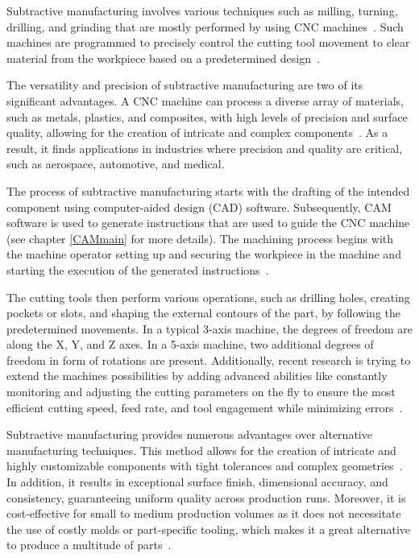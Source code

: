 Subtractive manufacturing involves various techniques such as milling, turning, drilling, and grinding that are mostly performed by using CNC machines~\cite{Kumar.2020}. Such machines are programmed to precisely control the cutting tool movement to clear material from the workpiece based on a predetermined design~\cite{Amanullah.2017}.

The versatility and precision of subtractive manufacturing are two of its significant advantages. A CNC machine can process a diverse array of materials, such as metals, plastics, and composites, with high levels of precision and surface quality, allowing for the creation of intricate and complex components~\cite{Tomaz.2021,Yang.2019}. As a result, it finds applications in industries where precision and quality are critical, such as aerospace, automotive, and medical.

The process of subtractive manufacturing starts with the drafting of the intended component using computer-aided design (CAD) software. Subsequently, CAM software is used to generate instructions that are used to guide the CNC machine (see chapter \ref{CAMmain} for more details). The machining process begins with the machine operator setting up and securing the workpiece in the machine and starting the execution of the generated instructions~\cite{Nee.2015}.

The cutting tools then perform various operations, such as drilling holes, creating pockets or slots, and shaping the external contours of the part, by following the predetermined movements. In a typical 3-axis machine, the degrees of freedom are along the X, Y, and Z axes. In a 5-axis machine, two additional degrees of freedom in form of rotations are present.   Additionally, recent research is trying to extend the machines possibilities by adding advanced abilities like constantly monitoring and adjusting the cutting parameters on the fly to ensure the most efficient cutting speed, feed rate, and tool engagement while minimizing errors~\cite{Tien.2021}.


Subtractive manufacturing provides numerous advantages over alternative manufacturing techniques. This method allows for the creation of intricate and highly customizable components with tight tolerances and complex geometries~\cite{Jayawardane.2023}. In addition, it results in exceptional surface finish, dimensional accuracy, and consistency, guaranteeing uniform quality across production runs. Moreover, it is cost-effective for small to medium production volumes as it does not necessitate the use of costly molds or part-specific tooling, which makes it a great alternative to produce a multitude of parts~\cite{Gu.2018}.


